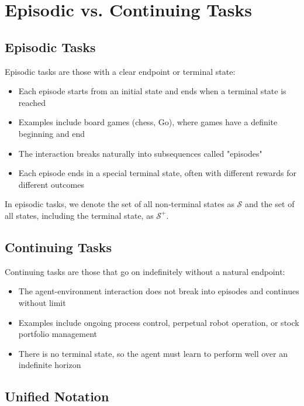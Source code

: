 \documentclass[12pt,a4paper]{article}
\begin{document}
\section{Episodic vs. Continuing Tasks}

\subsection{Episodic Tasks}

Episodic tasks are those with a clear endpoint or terminal state:

\begin{itemize}
    \item Each episode starts from an initial state and ends when a terminal state is reached
    \item Examples include board games (chess, Go), where games have a definite beginning and end
    \item The interaction breaks naturally into subsequences called "episodes"
    \item Each episode ends in a special terminal state, often with different rewards for different outcomes
\end{itemize}

In episodic tasks, we denote the set of all non-terminal states as $\mathcal{S}$ and the set of all states, including the terminal state, as $\mathcal{S}^+$.

\subsection{Continuing Tasks}

Continuing tasks are those that go on indefinitely without a natural endpoint:

\begin{itemize}
    \item The agent-environment interaction does not break into episodes and continues without limit
    \item Examples include ongoing process control, perpetual robot operation, or stock portfolio management
    \item There is no terminal state, so the agent must learn to perform well over an indefinite horizon
\end{itemize}

\subsection{Unified Notation}
\end{document}
